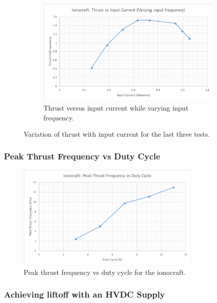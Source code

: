 \documentclass[11pt]{article}
\begin{document}
\begin{figure}[h!]
\begin{subfigure}{0.49\textwidth}
\end{subfigure}
\begin{subfigure}{0.49\textwidth}
\centering
\includegraphics[width = \textwidth]{craft_c3}
\caption{\label{fig:craft_c3} Thrust versus input current while varying input frequency.}
\end{subfigure}
\caption{\label{fig:craft_current} Variation of thrust with input current for the last three tests.}
\end{figure}

\subsubsection{Peak Thrust Frequency vs Duty Cycle}

\begin{figure}[h!]
\centering
\includegraphics[width = 0.8\textwidth]{craft_g4}
\caption{\label{fig:craft_g4} Peak thrust frequency vs duty cycle for the ionocraft.}
\end{figure}

\subsubsection{Achieving liftoff with an HVDC Supply}
\end{document}
